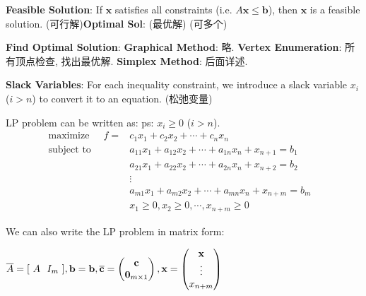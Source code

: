 \documentclass[9pt]{article}
\begin{document}
\vspace{-15pt}
\textbf{Feasible Solution}: If $\mathbf{x}$ satisfies all constraints (i.e. $A\mathbf{x}\leq\mathbf{b}$), then $\mathbf{x}$ is a feasible solution. {\footnotesize (可行解)}\quad \textbf{Optimal Sol}: {\footnotesize (最优解) (可多个)}

\textbf{Find Optimal Solution}: \textbf{Graphical Method}: {\footnotesize 略.} \quad \textbf{Vertex Enumeration}: {\footnotesize 所有顶点检查, 找出最优解.} \quad \textbf{Simplex Method}: {\footnotesize 后面详述.}

\textbf{Slack Variables}: For each inequality constraint, we introduce a slack variable $x_i$ ($i>n$) to convert it to an equation. {\footnotesize (松弛变量)}

\vspace{-9pt}
\begin{multicols}{2}

    LP problem can be written as: \quad \quad ps: $x_{i}\geq0$ ($i>n$).
    \begin{align*}
        \text{maximize} \quad \ \ f = & c_1x_1 + c_2x_2 + \cdots + c_nx_n & \\
        \text{subject to} \quad \qquad & a_{11}x_1 + a_{12}x_2 + \cdots + a_{1n}x_n + x_{n+1} = b_1 & \\
                                & a_{21}x_1 + a_{22}x_2 + \cdots + a_{2n}x_n + x_{n+2} = b_2 & \\
                                & \vdots & \\
                                & a_{m1}x_1 + a_{m2}x_2 + \cdots + a_{mn}x_n + x_{n+m} = b_m & \\
                                & x_1 \geq 0, x_2 \geq 0, \cdots, x_{n+m} \geq 0 &
    \end{align*}
    
    \columnbreak

    We can also write the LP problem in matrix form:

    \vspace{5pt}
    $
    \overline{A}= [ \ A  \ \ I_m \ ]
    ,\mathbf{b}=\mathbf{b}
    ,\overline{\mathbf{c}}=
    \begin{pmatrix}
        \mathbf{c} \\
        \mathbf{0}_{\tiny m\times 1}
    \end{pmatrix}
    ,\mathbf{x}=
    \begin{pmatrix}
        \mathbf{x} \\
        \vdots \\
        x_{\tiny n+m}
    \end{pmatrix}
    $


\end{multicols}
\end{document}
